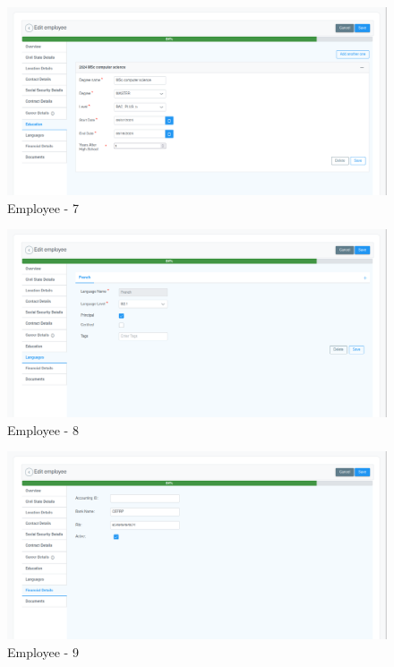 \documentclass[12pt,a4paper,table,english]{article}
\begin{document}
		
	\begin{figure}[H]
		\centering
		\includegraphics[width=150mm]{Image/employee7}
		\caption{Employee - 7}
		\label{fig:Employee - 7}
	\end{figure}
	
		
	\begin{figure}[H]
		\centering
		\includegraphics[width=150mm]{Image/employee8}
		\caption{Employee - 8}
		\label{fig:Employee - 8}
	\end{figure}
	
		
	\begin{figure}[H]
		\centering
		\includegraphics[width=150mm]{Image/employee9}
		\caption{Employee - 9}
		\label{fig:Employee - 9}
	\end{figure}
	
\end{document}
